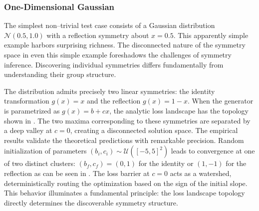             \subsubsection{One-Dimensional Gaussian}
                The simplest non--trivial test case consists of a Gaussian distribution \(\mathcal{N}(0.5,1.0)\) with a reflection symmetry about \(x=0.5\).
                This apparently simple example harbors surprising richness.
                The disconnected nature of the symmetry space in even this simple example foreshadows the challenges of symmetry inference.
                Discovering individual symmetries differs fundamentally from understanding their group structure.

                The distribution admits precisely two linear symmetries: the identity transformation \(g(x)=x\) and the reflection \(g(x)=1-x\).
                When the generator is parametrized as \(g(x)=b+cx\), the analytic loss landscape has the topology shown in .
                The two maxima corresponding to these symmetries are separated by a deep valley at \(c=0\), creating a disconnected solution space.
                The empirical results validate the theoretical predictions with remarkable precision.
                Random initialization of parameters \((b_i, c_i) \sim \mathcal{U}([-5, 5]^2)\) leads to convergence at one of two distinct clusters: \((b_f, c_f) = (0, 1)\) for the identity or \((1, -1)\) for the reflection as can be seen in .
                The loss barrier at \(c=0\) acts as a watershed, deterministically routing the optimization based on the sign of the initial slope.
                This behavior illuminates a fundamental principle: the loss landscape topology directly determines the discoverable symmetry structure.
